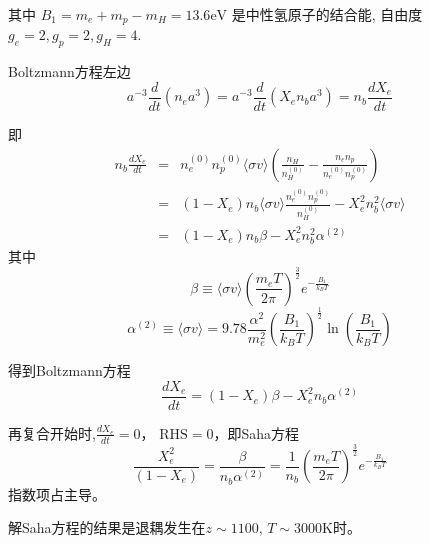 \documentclass[]{ctexart}
\begin{document}
  
其中 $B_1=m_e+m_p - m_H=13.6\mathrm{eV}$ 是中性氢原子的结合能, 自由度 $g_e=2,g_p=2,g_H=4$.

Boltzmann方程左边
\begin{equation}
    a^{-3} \frac{d}{d t}\left(n_{e} a^{3}\right)= a^{-3} \frac{d}{d t}\left(X_{e} n_{b} a^{3}\right) = n_b \frac{d X_e}{dt}
\end{equation}

即
\begin{eqnarray}
    n_b \frac{d X_e}{dt} &=& n_{e}^{(0)} n_{p}^{(0)}\langle\sigma v\rangle\left(\frac{n_H}{n_{H}^{(0)}}-\frac{n_{e} n_{p}}{n_{e}^{(0)} n_{p}^{(0)}}\right)   \\ 
    &=& (1-X_e) n_b \langle\sigma v\rangle \frac{n_{e}^{(0)} n_{p}^{(0)}}{n_H^{(0)}} - X_e^2 n_b^2 \langle\sigma v\rangle \\
    &=& (1-X_e) n_b \beta  - X_e^2 n_b^2 \alpha^{(2)}
\end{eqnarray}
其中
\begin{equation}
    \beta \equiv \langle\sigma v\rangle\left(\frac{m_{e} T}{2 \pi}\right)^\frac{3 }{2} e^{-\frac{B_1}{k_B T}}
\end{equation}
\begin{equation}
    \alpha^{(2)} \equiv \langle\sigma v\rangle=9.78 \frac{\alpha^{2}}{m_{e}^{2}}\left(\frac{B_{1}}{k_{B} T}\right)^\frac{1 }{2} \ln \left(\frac{B_{1}}{k_{B} T}\right)
\end{equation}

得到Boltzmann方程
\begin{equation}
    \frac{d X_{e}}{d t}=\left(1-X_{e}\right) \beta-X_{e}^{2} n_{b} \alpha^{(2)}
\end{equation}

再复合开始时,$\frac{d X_{e}}{d t}=0$， $\text{RHS}=0$，即Saha方程
\begin{equation}
    \frac{X_{e}^{2}}{\left(1-X_{e}\right)} = \frac{\beta}{n_{b} \alpha^{(2)}} = \frac{1 }{n_b} \left(\frac{m_{e} T}{2 \pi}\right)^\frac{3 }{2} e^{-\frac{B_1}{k_B T}}
\end{equation}
指数项占主导。

解Saha方程的结果是退耦发生在$z\sim 1100$, $T\sim 3000\mathrm{K}$时。
\end{document}
